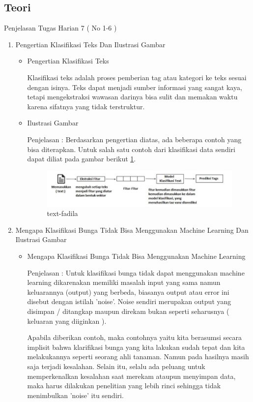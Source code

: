 \subsection{Teori}
Penjelasan Tugas Harian 7 ( No 1-6 )
\begin{enumerate}
\item Pengertian Klasifikasi Teks Dan Ilustrasi Gambar
\begin{itemize}
\item Pengertian Klasifikasi Teks
\par Klasifikasi teks adalah proses pemberian tag atau kategori ke teks sesuai dengan isinya. Teks dapat menjadi sumber informasi yang sangat kaya, tetapi mengekstraksi wawasan darinya bisa sulit dan memakan waktu karena sifatnya yang tidak terstruktur.
\par
\item Ilustrasi Gambar
\par Penjelasan : Berdasarkan pengertian diatas, ada beberapa contoh yang bisa diterapkan. Untuk salah satu contoh dari klasifikasi data sendiri dapat diliat pada gambar berikut \ref{text-fadila}.
\begin{figure}[!hbtp]
\centering
\includegraphics[scale=0.3]{figures/text-fadila.jpg}
\caption{text-fadila}
\label{text-fadila}
\end{figure}
\par
\end{itemize}
\par
\par
\item Mengapa Klasifikasi Bunga Tidak Bisa Menggunakan Machine Learning Dan Ilustrasi Gambar
\begin{itemize}
\item  Mengapa Klasifikasi Bunga Tidak Bisa Menggunakan Machine Learning
\par Penjelasan : Untuk klasifikasi bunga tidak dapat menggunakan machine learning dikarenakan memiliki masalah input yang sama namun keluarannya (output) yang berbeda, biasanya output atau error ini disebut dengan istilah 'noise'. Noise sendiri merupakan output yang disimpan / ditangkap maupun direkam bukan seperti seharusnya ( keluaran yang diiginkan ). 
\par Apabila diberikan contoh, maka contohnya yaitu kita berasumsi secara implisit bahwa klarifikasi bunga yang kita lakukan sudah tepat dan kita melakukannya seperti seorang ahli tanaman. Namun pada hasilnya masih saja terjadi kesalahan. Selain itu, selalu ada peluang untuk memperkenalkan kesalahan saat merekam ataupun menyimpan data, maka harus dilakukan penelitian yang lebih rinci sehingga tidak menimbulkan 'noise' itu sendiri.

\end{itemize}
\end{enumerate}
